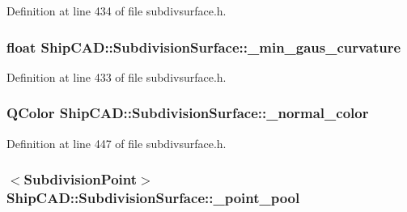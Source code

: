 Definition at line 434 of file subdivsurface.\+h.

\subsubsection[{\texorpdfstring{\+\_\+min\+\_\+gaus\+\_\+curvature}{_min_gaus_curvature}}]{\setlength{\rightskip}{0pt plus 5cm}float Ship\+C\+A\+D\+::\+Subdivision\+Surface\+::\+\_\+min\+\_\+gaus\+\_\+curvature\hspace{0.3cm}{\ttfamily [protected]}}\hypertarget{classShipCAD_1_1SubdivisionSurface_ac343c30f7e4e6a5926fdfed7da3f9385}{}\label{classShipCAD_1_1SubdivisionSurface_ac343c30f7e4e6a5926fdfed7da3f9385}


Definition at line 433 of file subdivsurface.\+h.

\subsubsection[{\texorpdfstring{\+\_\+normal\+\_\+color}{_normal_color}}]{\setlength{\rightskip}{0pt plus 5cm}Q\+Color Ship\+C\+A\+D\+::\+Subdivision\+Surface\+::\+\_\+normal\+\_\+color\hspace{0.3cm}{\ttfamily [protected]}}\hypertarget{classShipCAD_1_1SubdivisionSurface_a62cbe24451a794c0da3660ed0f1066ca}{}\label{classShipCAD_1_1SubdivisionSurface_a62cbe24451a794c0da3660ed0f1066ca}


Definition at line 447 of file subdivsurface.\+h.

\subsubsection[{\texorpdfstring{\+\_\+point\+\_\+pool}{_point_pool}}]{$<${\bf Subdivision\+Point}$>$ Ship\+C\+A\+D\+::\+Subdivision\+Surface\+::\+\_\+point\+\_\+pool\hspace{0.3cm}{\ttfamily [protected]}}\hypertarget{classShipCAD_1_1SubdivisionSurface_a58736ba52015c2d17f0c67ba12406699}{}\label{classShipCAD_1_1SubdivisionSurface_a58736ba52015c2d17f0c67ba12406699}


